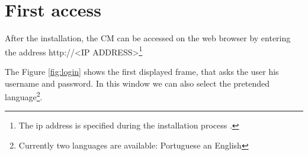\pagebreak


\section{First access}
\label{sec:first_access}
After the installation, the CM can be accessed on the web browser by entering the address http://<IP ADDRESS>\footnote{The ip address is specified during the installation process 
.}


The Figure \ref{fig:login} shows the first displayed frame, that asks the user his username and password. In this window we can also select the pretended language\footnote{Currently two languages are available: Portuguese an English}.

